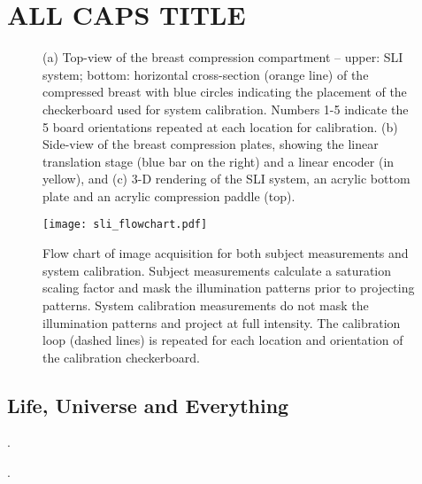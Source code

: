 
\chapter{ALL CAPS TITLE} %
\label{chap:sample}





\begin{figure}
	\begin{center}
	\end{center}
	\caption{ (a) Top-view of the breast compression compartment -- upper: SLI system; bottom: horizontal cross-section (orange line) of the compressed breast with blue circles indicating the placement of the checkerboard used for system calibration. Numbers 1-5 indicate the 5 board orientations repeated at each location for calibration. (b) Side-view of the breast compression plates, showing the linear translation stage (blue bar on the right) and a linear encoder (in yellow), and  (c) 3-D rendering of the SLI system, an acrylic bottom plate and an acrylic compression paddle (top). } 
	\label{fig:mammographysetup}
\end{figure} 


\begin{figure}
    \begin{center}
    \texttt{[image: sli\_flowchart.pdf]}
    \end{center}
    \caption{Flow chart of image acquisition for both subject measurements and system calibration. Subject measurements calculate a saturation scaling factor and mask the illumination patterns prior to projecting patterns. System calibration measurements do not mask the illumination patterns and project at full intensity. The calibration loop (dashed lines) is repeated for each location and orientation of the calibration checkerboard.} 
    \label{fig:sli_flowchart}
\end{figure} 



\section{Life, Universe and Everything}
\label{chap:intro:design}

. 

.




